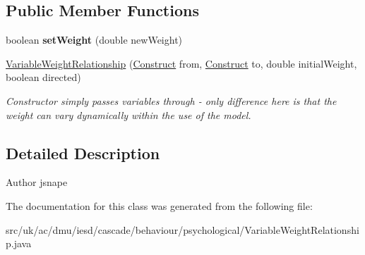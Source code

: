 \subsection*{Public Member Functions}
\begin{DoxyCompactItemize}
\item 
\hypertarget{classuk_1_1ac_1_1dmu_1_1iesd_1_1cascade_1_1behaviour_1_1psychological_1_1_variable_weight_relationship_a5b041f059d88e97b5e3fe529c053a06f}{boolean {\bfseries set\-Weight} (double new\-Weight)}\label{classuk_1_1ac_1_1dmu_1_1iesd_1_1cascade_1_1behaviour_1_1psychological_1_1_variable_weight_relationship_a5b041f059d88e97b5e3fe529c053a06f}

\item 
\hypertarget{classuk_1_1ac_1_1dmu_1_1iesd_1_1cascade_1_1behaviour_1_1psychological_1_1_variable_weight_relationship_a74cbc135e277cfa74aa707160806fb9d}{\hyperlink{classuk_1_1ac_1_1dmu_1_1iesd_1_1cascade_1_1behaviour_1_1psychological_1_1_variable_weight_relationship_a74cbc135e277cfa74aa707160806fb9d}{Variable\-Weight\-Relationship} (\hyperlink{interfaceuk_1_1ac_1_1dmu_1_1iesd_1_1cascade_1_1behaviour_1_1psychological_1_1_construct}{Construct} from, \hyperlink{interfaceuk_1_1ac_1_1dmu_1_1iesd_1_1cascade_1_1behaviour_1_1psychological_1_1_construct}{Construct} to, double initial\-Weight, boolean directed)}\label{classuk_1_1ac_1_1dmu_1_1iesd_1_1cascade_1_1behaviour_1_1psychological_1_1_variable_weight_relationship_a74cbc135e277cfa74aa707160806fb9d}

\begin{DoxyCompactList}\small\item\em Constructor simply passes variables through -\/ only difference here is that the weight can vary dynamically within the use of the model. \end{DoxyCompactList}\end{DoxyCompactItemize}


\subsection{Detailed Description}
\begin{DoxyAuthor}{Author}
jsnape 
\end{DoxyAuthor}


The documentation for this class was generated from the following file\-:\begin{DoxyCompactItemize}
\item 
src/uk/ac/dmu/iesd/cascade/behaviour/psychological/Variable\-Weight\-Relationship.\-java\end{DoxyCompactItemize}
